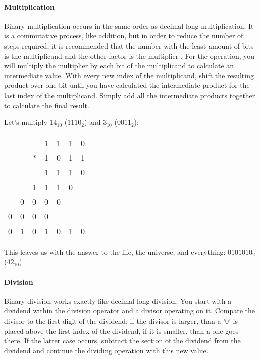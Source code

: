     \paragraph*{Multiplication} Binary multiplication occurs in the same order as decimal long multiplication.
    It is a commutative process, like addition, but in order to reduce the number of steps required, it is recommended that the number with the least amount of bits is the multiplicand  and the other factor is the multiplier .
    For the operation, you will multiply the multiplier by each bit of the multiplicand to calculate an intermediate value.
    With every new index of the multiplicand, shift the resulting product over one bit until you have calculated the intermediate product for the last index of the multiplicand.
    Simply add all the intermediate products together to calculate the final result.

    \begin{example}
        Let's multiply $14_{10}$ ($1110_2$) and $3_{10}$ ($0011_2$):
        \begin{center}
            \begin{tabular}{cccccccc}
                  &   &   & 1 & 1 & 1 & 0 \\
                  &   & * & 1 & 0 & 1 & 1 \\
                \hline
                  &   &   & 1 & 1 & 1 & 0 \\
                  &   & 1 & 1 & 1 & 0 &   \\
                  & 0 & 0 & 0 & 0 &   &   \\
                0 & 0 & 0 & 0 &   &   &   \\
                \hline
                0 & 1 & 0 & 1 & 0 & 1 & 0 \\  
            \end{tabular}
        \end{center}
        This leaves us with the answer to the life, the universe, and everything: $0101010_2$ ($42_{10}$).
    \end{example}

    \paragraph*{Division} Binary division works exactly like decimal long division.
    You start with a dividend within the division operator and a divisor operating on it.
    Compare the divisor to the first digit of the dividend; if the divisor is larger, than a '0' is placed above the first index of the dividend, if it is smaller, than a one goes there.
    If the latter case occurs, subtract the section of the dividend from the dividend and continue the dividing operation with this new value.


